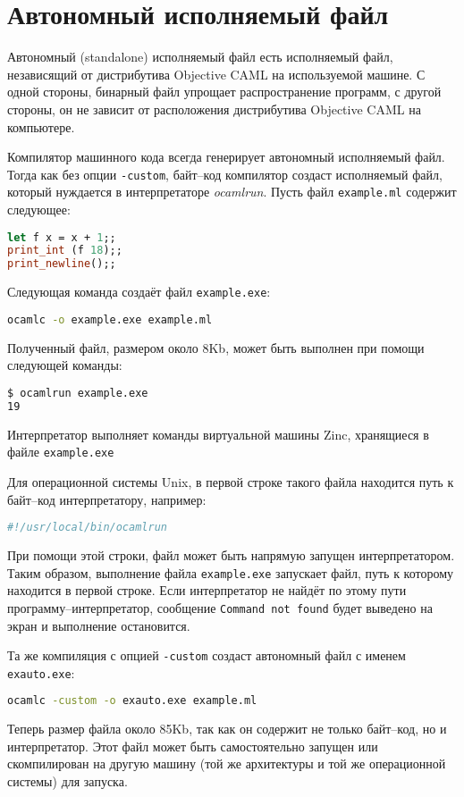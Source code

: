 \section{Автономный исполняемый файл}
\label{sec:standalone_executables}

Автономный (standalone) исполняемый файл есть исполняемый файл, независящий от
дистрибутива Objective CAML на используемой машине. С одной стороны, бинарный
файл упрощает распространение программ, с другой стороны, он не зависит от
расположения дистрибутива Objective CAML на компьютере.

Компилятор машинного кода всегда генерирует автономный исполняемый файл. Тогда
как без опции \texttt{-custom}, байт--код компилятор создаст исполняемый файл,
который нуждается в интерпретаторе {\it ocamlrun}. Пусть файл
\texttt{example.ml} содержит следующее:

\begin{lstlisting}[language=OCaml]
let f x = x + 1;;
print_int (f 18);;
print_newline();;
\end{lstlisting}

Следующая команда создаёт файл \texttt{example.exe}:

\begin{lstlisting}[language=Bash]
ocamlc -o example.exe example.ml
\end{lstlisting}

Полученный файл, размером около 8Kb, может быть выполнен при помощи следующей
команды:

\begin{lstlisting}[language=Bash]
$ ocamlrun example.exe
19
\end{lstlisting}

Интерпретатор выполняет команды виртуальной машины Zinc, хранящиеся в файле
\texttt{example.exe}

Для операционной системы Unix, в первой строке такого файла находится путь к
байт--код интерпретатору, например:

\begin{lstlisting}[language=Bash]
#!/usr/local/bin/ocamlrun
\end{lstlisting}

При помощи этой строки, файл может быть напрямую запущен интерпретатором. Таким
образом, выполнение файла \texttt{example.exe} запускает файл, путь к которому
находится в первой строке. Если интерпретатор не найдёт по этому пути
программу--интерпретатор, сообщение \texttt{Command not found} будет выведено на
экран и
выполнение остановится.

Та же компиляция с опцией \texttt{-custom} создаст автономный файл с именем
\texttt{exauto.exe}:

\begin{lstlisting}[language=Bash]
ocamlc -custom -o exauto.exe example.ml
\end{lstlisting}

Теперь размер файла около 85Kb, так как он содержит не только байт--код, но и
интерпретатор. Этот файл может быть самостоятельно запущен или скомпилирован на
другую машину (той же архитектуры и той же операционной системы) для запуска.
